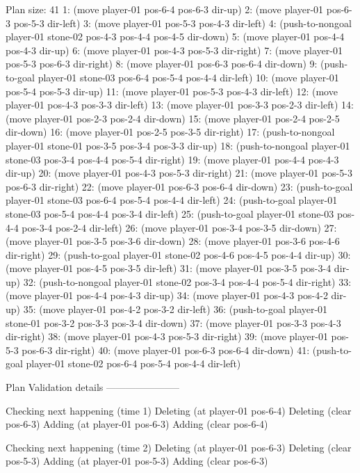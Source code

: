 Plan size: 41
1:
(move player-01 pos-6-4 pos-6-3 dir-up)
2:
(move player-01 pos-6-3 pos-5-3 dir-left)
3:
(move player-01 pos-5-3 pos-4-3 dir-left)
4:
(push-to-nongoal player-01 stone-02 pos-4-3 pos-4-4 pos-4-5 dir-down)
5:
(move player-01 pos-4-4 pos-4-3 dir-up)
6:
(move player-01 pos-4-3 pos-5-3 dir-right)
7:
(move player-01 pos-5-3 pos-6-3 dir-right)
8:
(move player-01 pos-6-3 pos-6-4 dir-down)
9:
(push-to-goal player-01 stone-03 pos-6-4 pos-5-4 pos-4-4 dir-left)
10:
(move player-01 pos-5-4 pos-5-3 dir-up)
11:
(move player-01 pos-5-3 pos-4-3 dir-left)
12:
(move player-01 pos-4-3 pos-3-3 dir-left)
13:
(move player-01 pos-3-3 pos-2-3 dir-left)
14:
(move player-01 pos-2-3 pos-2-4 dir-down)
15:
(move player-01 pos-2-4 pos-2-5 dir-down)
16:
(move player-01 pos-2-5 pos-3-5 dir-right)
17:
(push-to-nongoal player-01 stone-01 pos-3-5 pos-3-4 pos-3-3 dir-up)
18:
(push-to-nongoal player-01 stone-03 pos-3-4 pos-4-4 pos-5-4 dir-right)
19:
(move player-01 pos-4-4 pos-4-3 dir-up)
20:
(move player-01 pos-4-3 pos-5-3 dir-right)
21:
(move player-01 pos-5-3 pos-6-3 dir-right)
22:
(move player-01 pos-6-3 pos-6-4 dir-down)
23:
(push-to-goal player-01 stone-03 pos-6-4 pos-5-4 pos-4-4 dir-left)
24:
(push-to-goal player-01 stone-03 pos-5-4 pos-4-4 pos-3-4 dir-left)
25:
(push-to-goal player-01 stone-03 pos-4-4 pos-3-4 pos-2-4 dir-left)
26:
(move player-01 pos-3-4 pos-3-5 dir-down)
27:
(move player-01 pos-3-5 pos-3-6 dir-down)
28:
(move player-01 pos-3-6 pos-4-6 dir-right)
29:
(push-to-goal player-01 stone-02 pos-4-6 pos-4-5 pos-4-4 dir-up)
30:
(move player-01 pos-4-5 pos-3-5 dir-left)
31:
(move player-01 pos-3-5 pos-3-4 dir-up)
32:
(push-to-nongoal player-01 stone-02 pos-3-4 pos-4-4 pos-5-4 dir-right)
33:
(move player-01 pos-4-4 pos-4-3 dir-up)
34:
(move player-01 pos-4-3 pos-4-2 dir-up)
35:
(move player-01 pos-4-2 pos-3-2 dir-left)
36:
(push-to-goal player-01 stone-01 pos-3-2 pos-3-3 pos-3-4 dir-down)
37:
(move player-01 pos-3-3 pos-4-3 dir-right)
38:
(move player-01 pos-4-3 pos-5-3 dir-right)
39:
(move player-01 pos-5-3 pos-6-3 dir-right)
40:
(move player-01 pos-6-3 pos-6-4 dir-down)
41:
(push-to-goal player-01 stone-02 pos-6-4 pos-5-4 pos-4-4 dir-left)
 
Plan Validation details
-----------------------

Checking next happening (time 1)
Deleting (at player-01 pos-6-4)
Deleting (clear pos-6-3)
Adding (at player-01 pos-6-3)
Adding (clear pos-6-4)

Checking next happening (time 2)
Deleting (at player-01 pos-6-3)
Deleting (clear pos-5-3)
Adding (at player-01 pos-5-3)
Adding (clear pos-6-3)


